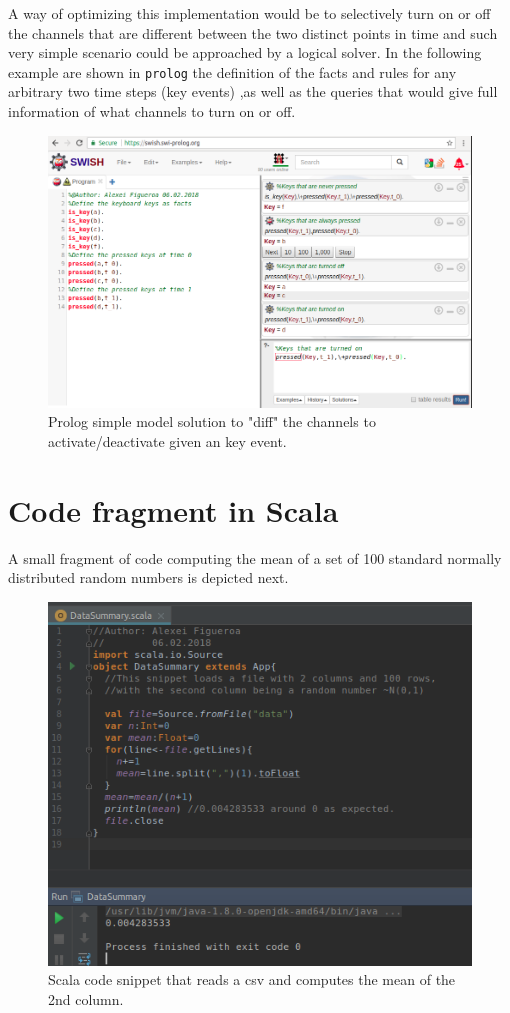 \documentclass[margin,line,a4paper,authoryear,12pt]{report}
\begin{document}
A way of optimizing this implementation would be to selectively turn on or off the channels that are different between the two 
distinct points in time and such very simple scenario could be approached by a logical solver.  In the following example are shown
in \texttt{prolog} the definition of the facts and rules for any arbitrary two time steps (key events) ,as well as the  queries that would give 
full information of what channels to turn on or off. 
\begin{figure}[h!]
    \centering
    \includegraphics[width=\linewidth]{prolog_solved_expressions.png}
    \caption{ Prolog simple model solution to "diff" the channels to activate/deactivate given an key event.}
    \label{fig:prolog}
\end{figure}
\chapter{Code fragment in Scala}
A small fragment of code computing the mean of a set of 100 standard normally distributed random numbers is depicted next.
\begin{figure}[h!]
    \centering
    \includegraphics[width=0.7\linewidth]{scala.png}
    \caption{ Scala code snippet that reads a csv and computes the mean of the 2nd column.}
    \label{fig:dsl_class}
\end{figure}
\end{document}
